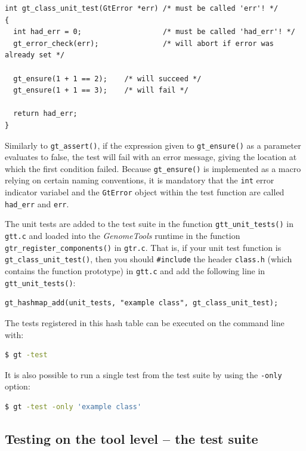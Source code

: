 \documentclass[11pt,final]{article}
\newcommand{\keyword}[1]{\lstinline{#1}}
\newcommand{\Gt}[0]{\emph{GenomeTools}\xspace}
\begin{document}
\begin{lstlisting}
int gt_class_unit_test(GtError *err) /* must be called 'err'! */
{
  int had_err = 0;                   /* must be called 'had_err'! */
  gt_error_check(err);               /* will abort if error was already set */

  gt_ensure(1 + 1 == 2);    /* will succeed */
  gt_ensure(1 + 1 == 3);    /* will fail */

  return had_err;
}
\end{lstlisting}

Similarly to \keyword{gt_assert()}, if the expression given to
\keyword{gt_ensure()} as a parameter evaluates to false, the test will fail with
an error message, giving the location at which the first condition failed.
Because \keyword{gt_ensure()} is implemented as a macro relying on certain
naming conventions, it is mandatory that the \keyword{int} error indicator
variabel and the \keyword{GtError} object within the test function are called
\keyword{had_err} and \keyword{err}.

The unit tests are added to the test suite in the function
\keyword{gtt_unit_tests()} in \keyword{gtt.c} and loaded into the \Gt runtime
in the function \keyword{gtr_register_components()} in \keyword{gtr.c}.
That is, if your unit test function is \keyword{gt_class_unit_test()}, then you
should \keyword{#include} the header \keyword{class.h} (which contains the
function prototype) in \keyword{gtt.c} and add the following line in
\keyword{gtt_unit_tests()}:
\begin{lstlisting}
gt_hashmap_add(unit_tests, "example class", gt_class_unit_test);
\end{lstlisting}

The tests registered in this hash table can be executed on the command line
with:

\begin{lstlisting}[language=sh]
$ gt -test
\end{lstlisting}%

It is also possible to run a single test from the test suite by using the
\keyword{-only} option:

\begin{lstlisting}[language=sh]
$ gt -test -only 'example class'
\end{lstlisting}%

\subsection{Testing on the tool level -- the test suite}
\end{document}
